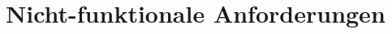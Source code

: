 \documentclass[../main.tex]{subfiles}
\begin{document}
	\section{Nicht-funktionale Anforderungen}
	\label{section:NonFunctionalRequirements}
\end{document}
